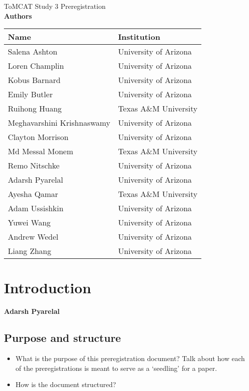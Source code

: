 \documentclass[oneside,9pt]{memoir}
\begin{document}
\begin{center}
    {\LARGE ToMCAT Study 3 Preregistration}\\
    \bigskip
    \textbf{Authors}
\end{center}

\begin{tabular}{ll}
    \toprule
    Name & Institution \\\midrule
    Salena Ashton & University of Arizona\\
    Loren Champlin & University of Arizona\\
    Kobus Barnard & University of Arizona\\
    Emily Butler & University of Arizona\\
    Ruihong Huang & Texas A\&M University \\
    Meghavarshini Krishnaswamy & University of Arizona\\
    Clayton Morrison & University of Arizona\\
    Md Messal Monem & Texas A\&M University \\
    Remo Nitschke & University of Arizona\\
    Adarsh Pyarelal & University of Arizona\\
    Ayesha Qamar & Texas A\&M University \\
    Adam Ussishkin& University of Arizona\\
    Yuwei Wang & University of Arizona\\
    Andrew Wedel & University of Arizona\\
    Liang Zhang & University of Arizona\\
    \bottomrule
\end{tabular}

\bigskip

\tableofcontents* 

\chapter{Introduction}
\textbf{Adarsh Pyarelal}

\section{Purpose and structure}
\begin{itemize}
    \item What is the purpose of this preregistration document? Talk about how
        each of the preregistrations is meant to serve as a `seedling' for a
        paper.
    \item How is the document structured?
\end{itemize}
\end{document}
